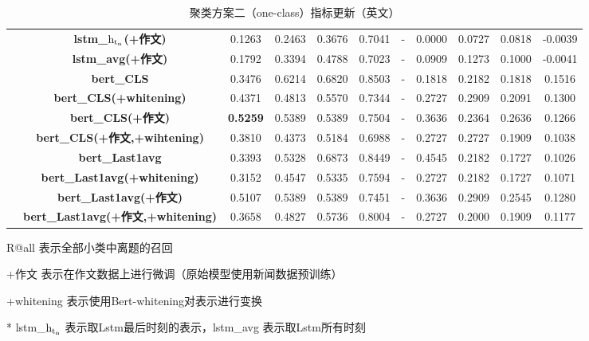 \documentclass[11pt]{article}
\begin{document}
\begin{CJK}{UTF8}{gkai}
\begin{table}[hp]
{\begin{tabular}{c|c|ccccccccc}
      & \textbf{lstm\_$\rm h_{t_n}$(+作文)} & 0.1263  & 0.2463  & 0.3676  & 0.7041  & -     & 0.0000  & 0.0727  & 0.0818  & -0.0039  \\
      & \textbf{lstm\_avg(+作文)} & 0.1792  & 0.3394  & 0.4788  & 0.7023  & -     & 0.0909  & 0.1273  & 0.1000  & -0.0041  \\
      \cline{2-11}
      & \textbf{bert\_CLS} & 0.3476  & 0.6214  & 0.6820  & 0.8503  & -     & 0.1818  & 0.2182  & 0.1818  & 0.1516  \\
      & \textbf{bert\_CLS(+whitening)} & 0.4371  & 0.4813  & 0.5570  & 0.7344  & -     & 0.2727  & 0.2909  & 0.2091  & 0.1300  \\
      & \textbf{bert\_CLS(+作文)} & \textcolor[rgb]{ 1,  0,  0}{\textbf{0.5259 }} & 0.5389  & 0.5389  & 0.7504  & -     & 0.3636  & 0.2364  & 0.2636  & 0.1266  \\
      & \textbf{bert\_CLS(+作文,+wihtening)} & 0.3810  & 0.4373  & 0.5184  & 0.6988  & -     & 0.2727  & 0.2727  & 0.1909  & 0.1038  \\
      \cline{2-11}
      & \textbf{bert\_Last1avg} & 0.3393  & 0.5328  & 0.6873  & 0.8449  & -     & 0.4545  & 0.2182  & 0.1727  & 0.1026  \\
      & \textbf{bert\_Last1avg(+whitening)} & 0.3152  & 0.4547  & 0.5335  & 0.7594  & -     & 0.2727  & 0.2182  & 0.1727  & 0.1071  \\
      & \textbf{bert\_Last1avg(+作文)} & 0.5107  & 0.5389  & 0.5389  & 0.7451  & -     & 0.3636  & 0.2909  & 0.2545  & 0.1280  \\
      & \textbf{bert\_Last1avg(+作文,+whitening)} & 0.3658  & 0.4827  & 0.5736  & 0.8004  & -     & 0.2727  & 0.2000  & 0.1909  & 0.1177  \\
      \hline
    \end{tabular}%
  }
  \begin{tablenotes}    %
    \footnotesize               %
    \item[1] R@all 表示全部小类中离题的召回
    \item[2] +作文 表示在作文数据上进行微调（原始模型使用新闻数据预训练） 
    \item[2] +whitening 表示使用Bert-whitening对表示进行变换
    \item[3] * lstm\_$\rm h_{t_n}$ 表示取Lstm最后时刻的表示，lstm\_avg 表示取Lstm所有时刻 
  \end{tablenotes} 
  \caption{聚类方案二（one-class）指标更新（英文）}
  \label{tab:addlabel}%
\end{table}%


\end{CJK}
\end{document}
